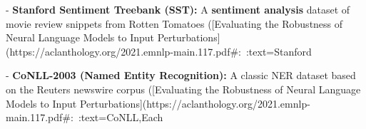 - \textbf{Stanford Sentiment Treebank (SST):} A \textbf{sentiment analysis} dataset of movie review snippets from Rotten Tomatoes ([Evaluating the Robustness of Neural Language Models to Input Perturbations](https://aclanthology.org/2021.emnlp-main.117.pdf#:~:text=Stanford%

- \textbf{CoNLL-2003 (Named Entity Recognition):} A classic NER dataset based on the Reuters newswire corpus ([Evaluating the Robustness of Neural Language Models to Input Perturbations](https://aclanthology.org/2021.emnlp-main.117.pdf#:~:text=CoNLL,Each%

